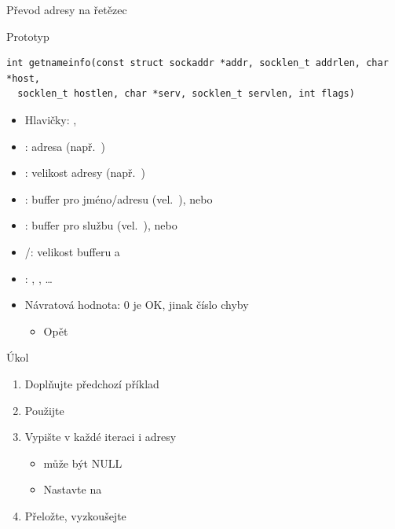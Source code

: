 \begin{frame}[fragile]{Převod adresy na řetězec}

  \begin{block}{Prototyp}
  \begin{lstlisting}[aboveskip=2pt,belowskip=2pt]
int getnameinfo(const struct sockaddr *addr, socklen_t addrlen, char *host,
  socklen_t hostlen, char *serv, socklen_t servlen, int flags)
  \end{lstlisting}
  \end{block}

  \begin{itemize}
    \item Hlavičky: , 
    \item {}: adresa (např.\ )
    \item {}: velikost adresy (např.\ )

    \pause

    \item {}: buffer pro jméno/adresu (vel.\ ), nebo
    \item {}: buffer pro službu (vel.\ ), nebo
    \item {}/: velikost bufferu  a

    \pause

    \item {}: , , \dots

    \pause

    \item Návratová hodnota: 0 je OK, jinak číslo chyby
    \begin{itemize}
      \item Opět 
    \end{itemize}
  \end{itemize}

\end{frame}

\begin{frame}{Úkol}

  \begin{enumerate}
    \item Doplňujte předchozí příklad
    \item Použijte 

    \item Vypište v každé iteraci i adresy
    \begin{itemize}
      \item {} může být NULL
      \item Nastavte  na 
    \end{itemize}

    \item Přeložte, vyzkoušejte
  \end{enumerate}

\end{frame}

